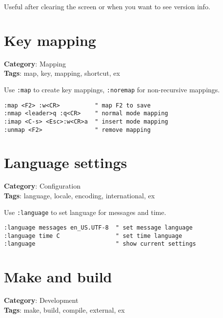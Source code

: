 {{{{{{Useful after clearing the screen or when you want to see version info.

\section{Key mapping}

\textbf{Category}: Mapping\\ \textbf{Tags}: map, key, mapping, shortcut, ex
\vspace{0.5cm}

Use {\footnotesize \Verb§:map§} to create key mappings, {\footnotesize \Verb§:noremap§} for non-recursive mappings.

\begin{Exa*}{}
\begin{Verbatim}[fontsize=\footnotesize, breaklines, breakanywhere]
:map <F2> :w<CR>          " map F2 to save
:nmap <leader>q :q<CR>    " normal mode mapping
:imap <C-s> <Esc>:w<CR>a  " insert mode mapping
:unmap <F2>               " remove mapping
\end{Verbatim}
\end{Exa*}

\section{Language settings}

\textbf{Category}: Configuration\\ \textbf{Tags}: language, locale, encoding, international, ex
\vspace{0.5cm}

Use {\footnotesize \Verb§:language§} to set language for messages and time.

\begin{Exa*}{}
\begin{Verbatim}[fontsize=\footnotesize, breaklines, breakanywhere]
:language messages en_US.UTF-8  " set message language
:language time C                " set time language
:language                       " show current settings
\end{Verbatim}
\end{Exa*}

\section{Make and build}

\textbf{Category}: Development\\ \textbf{Tags}: make, build, compile, external, ex
\vspace{0.5cm}

}}}}}}
